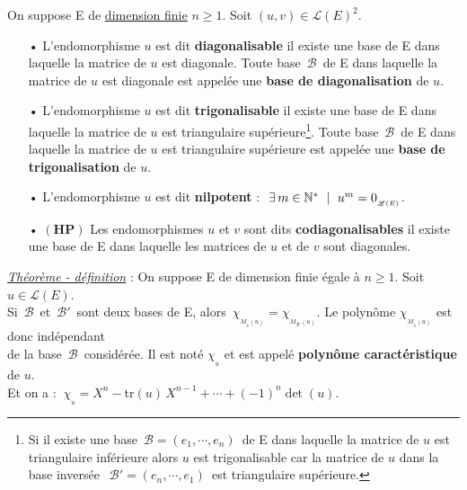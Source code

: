 \noindent On suppose E de \underline{dimension finie} \(n\geq 1\). Soit \((u,v)\in \mathscr{L}(E)^2.\)
\begin{itemize}[leftmargin=0.5cm]
    \item[•] L'endomorphisme $u$ est dit \textbf{diagonalisable} \ssi il existe une base de E dans laquelle la matrice de $u$ est diagonale. Toute base \(\,\mathcal{B}\,\) de E dans laquelle la matrice de $u$ est diagonale est appelée une \textbf{base de diagonalisation} de $u$.\vspace{.2cm}
    
    \item[•] L'endomorphisme $u$ est dit \textbf{trigonalisable} \ssi il existe une base de E dans laquelle la matrice de $u$ est triangulaire supérieure\footnote{Si il existe une base \(\,\mathcal{B}=(e_1,\cdots,e_n)\,\) de E dans laquelle la matrice de $u$ est triangulaire inférieure alors $u$ est trigonalisable car la matrice de $u$ dans la base \guillemetleft inversée\guillemetright\, \(\;\mathcal{B}'=(e_n,\cdots,e_1)\,\) est triangulaire supérieure.\vspace{0.2cm}}. Toute base \(\,\mathcal{B}\,\) de E dans laquelle la matrice de $u$ est triangulaire supérieure est appelée une \textbf{base de trigonalisation} de $u$\vspace{0.2cm}.
    
    \item[•] L'endomorphisme $u$ est dit \textbf{nilpotent} \ssi : \(\ \exists \, m\in \NN^* \ \mid \ u^m=0_{_{\mathscr{L}(E)}}\).\vspace{0.2cm}
    
    \item[•] \(\left(\mathbf{H} \mathbf{P}\right) \) Les endomorphismes $u$ et $v$ sont dits \textbf{codiagonalisables} \ssi il existe une base de E dans laquelle les matrices de $u$ et de $v$ sont diagonales.
\end{itemize}

\vspace{1.3cm}

\underline{\emph{Théorème - définition}} : On suppose E de dimension finie égale à $n\geq 1$. Soit \(u\in \mathscr{L}(E)\).\vspace{0.1cm}\\
Si \(\,\mathcal{B}\,\) et \(\,\mathcal{B}'\,\) sont deux bases de E, alors \(\,\chi_{_{M_{_{\mathcal{B}}}(u)}}=\chi_{_{M_{\mathcal{B}'}(u)}}\). Le polynôme \(\chi_{_{M_{_{\mathcal{B}}}(u)}}\) est donc indépendant\vspace{0.1cm}\\
de la base \(\,\mathcal{B}\,\) considérée. Il est noté \(\chi_{_u}\) et est appelé \textbf{polynôme caractéristique} de $u$.\vspace{0.15cm}\\
Et on a : \(\ \chi_{_u}=X^n-\text{tr}(u)\,X^{n-1}+\cdots+(-1)^n\det(u).\)
 
